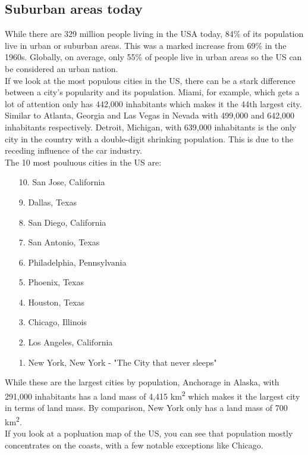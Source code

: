 \documentclass{article}
\begin{document}
	\subsection{Suburban areas today}
	While there are 329 million people living in the USA today, 84\% of its population live in urban or suburban areas. This was a marked increase from 69\% in the 1960s. Globally, on average, only 55\% of people live in urban areas so the US can be considered an urban nation. \\
	If we look at the most populous cities in the US, there can be a stark difference between a city's popularity and its population. Miami, for example, which gets a lot of attention only has 442,000 inhabitants which makes it the 44th largest city. Similar to Atlanta, Georgia and Las Vegas in Nevada with 499,000 and 642,000 inhabitants respectively. Detroit, Michigan, with 639,000 inhabitants is the only city in the country with a double-digit shrinking population. This is due to the receding influence of the car industry. \\
	The 10 most pouluous cities in the US are:
	\begin{itemize}
		\item[10.]{San Jose, California}
		\item[9.]{Dallas, Texas}
		\item[8.]{San Diego, California}
		\item[7.]{San Antonio, Texas}
		\item[6.]{Philadelphia, Pennsylvania}
		\item[5.]{Phoenix, Texas}
		\item[4.]{Houston, Texas}
		\item[3.]{Chicago, Illinois}
		\item[2.]{Los Angeles, California}
		\item[1.]{New York, New York - "The City that never sleeps"}
	\end{itemize}
	While these are the largest cities by population, Anchorage in Alaska, with 291,000 inhabitants has a land mass of 4,415 km\textsuperscript{2} which makes it the largest city in terms of land mass. By comparison, New York only has a land mass of 700 km\textsuperscript{2}. \\
	If you look at a popluation map of the US, you can see that population mostly concentrates on the coasts, with a few notable exceptions like Chicago. \\
\end{document}
